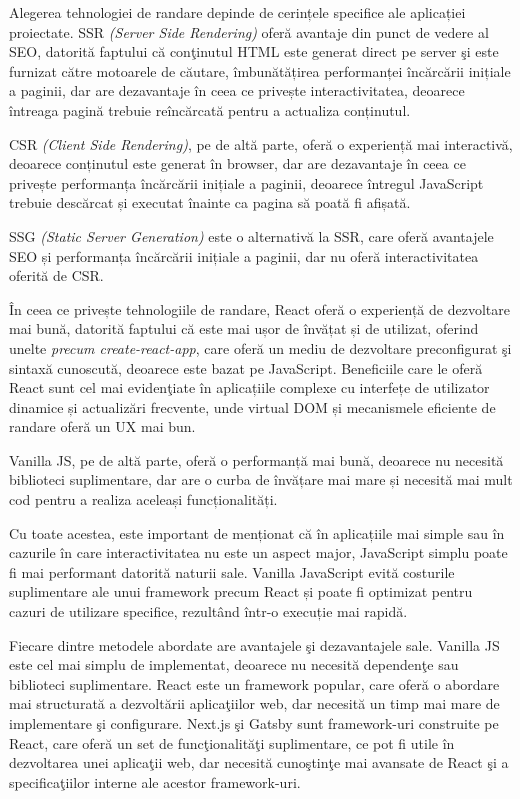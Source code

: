 \documentclass[12pt, a4paper]{report}
\begin{document}
Alegerea tehnologiei de randare depinde de cerințele specifice ale aplicației proiectate. SSR \textit{(Server Side Rendering)} oferă avantaje din punct de vedere al SEO, datorită faptului c\u a con\c tinutul HTML este generat direct pe server \c si este furnizat c\u atre motoarele de c\u autare, îmbunătățirea performanței încărcării inițiale a paginii, dar are dezavantaje în ceea ce privește interactivitatea, deoarece întreaga pagină trebuie reîncărcată pentru a actualiza conținutul. 

CSR \textit{(Client Side Rendering)}, pe de altă parte, oferă o experiență mai interactivă, deoarece conținutul este generat în browser, dar are dezavantaje în ceea ce privește performanța încărcării inițiale a paginii, deoarece întregul JavaScript trebuie descărcat și executat înainte ca pagina să poată fi afișată.

SSG \textit{(Static Server Generation)} este o alternativă la SSR, care oferă avantajele SEO și performanța încărcării inițiale a paginii, dar nu oferă interactivitatea oferită de CSR. 

În ceea ce privește tehnologiile de randare, React oferă o experiență de dezvoltare mai bună, datorită faptului că este mai ușor de învățat și de utilizat, oferind unelte \textit{precum create-react-app}, care oferă un mediu de dezvoltare preconfigurat \c si sintax\u a cunoscut\u a, deoarece este bazat pe JavaScript. Beneficiile care le ofer\u a React sunt cel mai eviden\c tiate în aplicațiile complexe cu interfețe de utilizator dinamice și actualizări frecvente, unde virtual DOM și mecanismele eficiente de randare oferă un UX mai bun.

Vanilla JS, pe de altă parte, oferă o performanță mai bună, deoarece nu necesită biblioteci suplimentare, dar are o curba de învățare mai mare și necesită mai mult cod pentru a realiza aceleași funcționalități.

Cu toate acestea, este important de menționat că în aplicațiile mai simple sau în cazurile în care interactivitatea nu este un aspect major, JavaScript simplu poate fi mai performant datorită naturii sale. Vanilla JavaScript evită costurile suplimentare ale unui framework precum React și poate fi optimizat pentru cazuri de utilizare specifice, rezultând \^intr-o  execuție mai rapidă.

Fiecare dintre metodele abordate are avantajele \c si dezavantajele sale. Vanilla JS este cel mai simplu de implementat, deoarece nu necesit\u a dependen\c te sau biblioteci suplimentare. React este un framework popular, care ofer\u a o abordare mai structurat\u a a dezvolt\u arii aplica\c tiilor web, dar necesit\u a un timp mai mare de implementare \c si configurare. Next.js \c si Gatsby sunt framework-uri construite pe React, care ofer\u a un set de func\c tionalit\u a\c ti suplimentare, ce pot fi utile \^ in dezvoltarea unei aplica\c tii web, dar necesit\u a cuno\c stin\c te mai avansate de React \c si a specifica\c tiilor interne ale acestor framework-uri.
\end{document}
